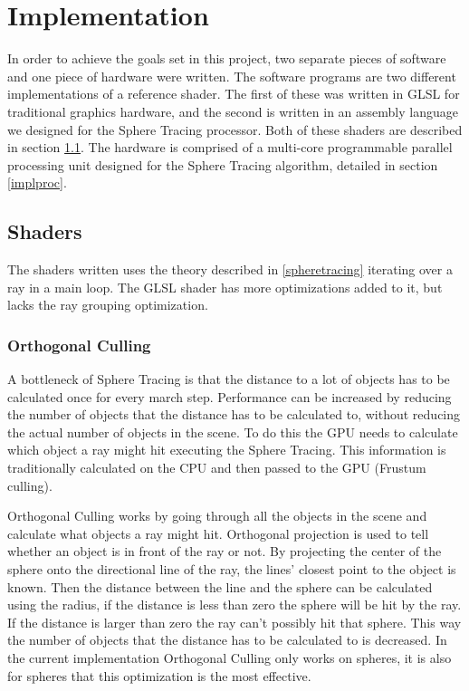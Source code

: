 \chapter{Implementation}

	In order to achieve the goals set in this project, two separate pieces of
	software and one piece of hardware were written. The software programs are
	two different implementations of a reference shader. The first of these was
	written in GLSL for traditional graphics hardware, and the second is written
	in an assembly language we designed for the Sphere Tracing processor. Both of
	these shaders are described in section \ref{implshader}.
	The hardware is comprised of a multi-core programmable parallel processing
	unit designed for the Sphere Tracing algorithm, detailed in section
	\ref{implproc}.
	
	\section{Shaders} \label{implshader}

		The shaders written uses the theory described in \ref{spheretracing}
		iterating over a ray in a main loop. The GLSL shader has more
		optimizations added to it, but lacks the ray grouping optimization.

		\subsection{Orthogonal Culling}

			A bottleneck of Sphere Tracing is that the distance to a lot of objects
			has to be calculated once for every march step. Performance can be
			increased by reducing the number of objects that the distance has 
			to be calculated to, without reducing the actual number of objects in the
			scene. To do this the GPU needs to calculate which object a ray might hit executing the Sphere Tracing. This information is traditionally
			calculated on the CPU and then passed to the GPU (Frustum culling).

			Orthogonal Culling works by going through all the objects in the scene
			and calculate what objects a ray might hit. Orthogonal projection is
			used to tell whether an object is in front of the ray or not. By
			projecting the center of the sphere onto the directional line of the ray,
			the lines' closest point to the object is known. Then the distance
			between the line and the sphere can be calculated using the radius, if
			the distance is less than zero the sphere will be hit by the ray. If the
			distance is larger than zero the ray can't possibly hit that sphere. This
			way the number of objects that the distance has to be calculated to is
			decreased. In the current implementation Orthogonal Culling only works on spheres, it is also for spheres that this optimization is the most effective.

